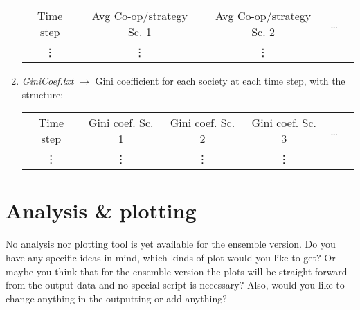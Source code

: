 \documentclass{article}
\begin{document}
\begin{enumerate}
\begin{center}
\begin{tabular}{c c c c c }
Time step & Avg Co-op/strategy Sc. 1 & Avg Co-op/strategy Sc. 2  & \dots \\
\vdots &  \vdots &  \vdots &
\end{tabular} 
\end{center}

\item \emph{GiniCoef.txt} $\rightarrow$ Gini coefficient for each society at each time step, with the structure:

\begin{center}
\begin{tabular}{c c c c c c}
Time step & Gini coef. Sc. 1 & Gini coef. Sc. 2 & Gini coef. Sc. 3  & \dots \\ 
\vdots & \vdots &  \vdots &  \vdots &
\end{tabular} 
\end{center}

\end{enumerate}

\section{Analysis \& plotting}
No analysis nor plotting tool is yet available for the ensemble version. Do you have any specific ideas in mind, which kinds of plot would you like to get? Or maybe you think that for the ensemble version the plots will be straight forward from the output data and no special script is necessary? Also, would you like to change anything in the outputting or add anything?
\end{document}

